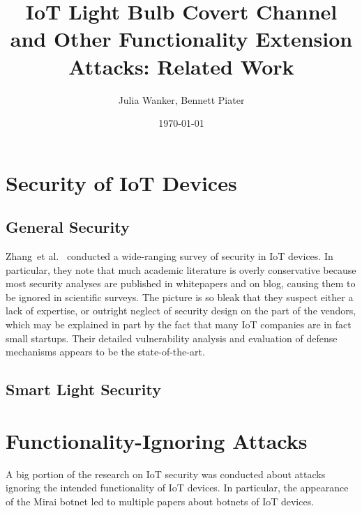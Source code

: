 \documentclass[11pt,a4paper]{article}
\begin{document}
	\title{IoT Light Bulb Covert Channel and Other Functionality Extension Attacks: Related Work}
	\author{Julia Wanker, Bennett Piater}
	\date{\today}
	\maketitle

	\section{Security of IoT Devices}%
	\label{sec:security_of_iot_devices}

	\subsection{General Security}%
	\label{sub:general_security}

	\cite{Restuccia:2018:SITNPaRC} %

  Zhang~et al.~\cite{Zhang:2017:UISTDCBWWNaWWG} %
	conducted a wide-ranging survey of security in IoT devices.
	In particular, they note that much academic literature is overly conservative because most security analyses are published in whitepapers and on blog, causing them to be ignored in scientific surveys.
	The picture is so bleak that they suspect either a lack of expertise, or outright neglect of security design on the part of the vendors, which may be explained in part by the fact that many IoT companies are in fact small startups.
	Their detailed vulnerability analysis and evaluation of defense mechanisms appears to be the state-of-the-art.

	\subsection{Smart Light Security}%
	\label{sub:smart_light_security}
	\cite{Dhanjani:2013:HLSEPHPWLS} %
	\cite{Morgner:2016:AYBBUICSSCLS} %
	\cite{Ronen:2018:IGNCZCR} %

	\section{Functionality-Ignoring Attacks}%
	\label{sec:functionality_ignoring_attacks}
	A big portion of the research on IoT security was conducted about attacks ignoring the intended functionality of IoT devices. In particular, the appearance of the Mirai botnet led to multiple papers about botnets of IoT devices.
\end{document}
